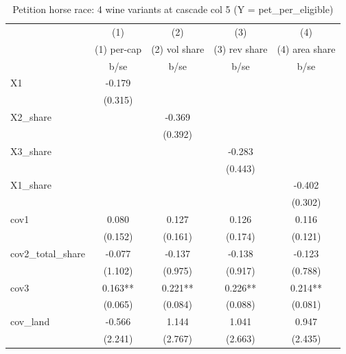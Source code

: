 \begin{table}[htbp]\centering
\def\sym#1{\ifmmode^{#1}\else\(^{#1}\)\fi}
\caption{Petition horse race: 4 wine variants at cascade col 5  (Y = pet\_per\_eligible) \label{tab:pethr}}
\begin{tabular}{l*{4}{c}}
\toprule
            &\multicolumn{1}{c}{(1)}&\multicolumn{1}{c}{(2)}&\multicolumn{1}{c}{(3)}&\multicolumn{1}{c}{(4)}\\
            &\multicolumn{1}{c}{(1) per-cap}&\multicolumn{1}{c}{(2) vol share}&\multicolumn{1}{c}{(3) rev share}&\multicolumn{1}{c}{(4) area share}\\
            &        b/se   &        b/se   &        b/se   &        b/se   \\
\midrule
X1          &      -0.179   &               &               &               \\
            &     (0.315)   &               &               &               \\
X2\_share    &               &      -0.369   &               &               \\
            &               &     (0.392)   &               &               \\
X3\_share    &               &               &      -0.283   &               \\
            &               &               &     (0.443)   &               \\
X1\_share    &               &               &               &      -0.402   \\
            &               &               &               &     (0.302)   \\
cov1        &       0.080   &       0.127   &       0.126   &       0.116   \\
            &     (0.152)   &     (0.161)   &     (0.174)   &     (0.121)   \\
cov2\_total\_share&      -0.077   &      -0.137   &      -0.138   &      -0.123   \\
            &     (1.102)   &     (0.975)   &     (0.917)   &     (0.788)   \\
cov3        &       0.163** &       0.221** &       0.226** &       0.214** \\
            &     (0.065)   &     (0.084)   &     (0.088)   &     (0.081)   \\
cov\_land    &      -0.566   &       1.144   &       1.041   &       0.947   \\
            &     (2.241)   &     (2.767)   &     (2.663)   &     (2.435)   \\

\end{tabular}
\end{table}
